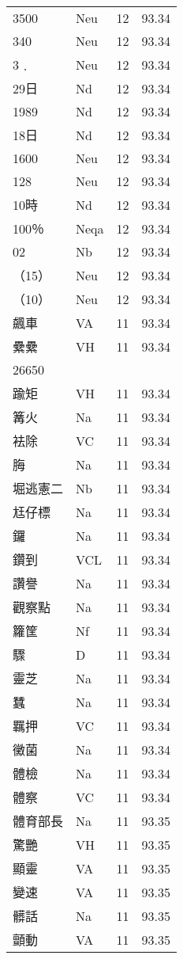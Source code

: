 \documentclass[twocolumn]{book}
\begin{document}
\begin{supertabular}{llrr}
3500 & Neu & 12 &  93.34\\
340 & Neu & 12 &  93.34\\
3﹒ & Neu & 12 &  93.34\\
29日 & Nd & 12 &  93.34\\
1989 & Nd & 12 &  93.34\\
18日 & Nd & 12 &  93.34\\
1600 & Neu & 12 &  93.34\\
128 & Neu & 12 &  93.34\\
10時 & Nd & 12 &  93.34\\
100％ & Neqa & 12 &  93.34\\
02 & Nb & 12 &  93.34\\
（15） & Neu & 12 &  93.34\\
（10） & Neu & 12 &  93.34\\
飆車 & VA & 11 &  93.34\\
纍纍 & VH & 11 &  93.34\\
26650\\
踰矩 & VH & 11 &  93.34\\
篝火 & Na & 11 &  93.34\\
袪除 & VC & 11 &  93.34\\
脢 & Na & 11 &  93.34\\
堀逃憲二 & Nb & 11 &  93.34\\
尪仔標 & Na & 11 &  93.34\\
鑼 & Na & 11 &  93.34\\
鑽到 & VCL & 11 &  93.34\\
讚譽 & Na & 11 &  93.34\\
觀察點 & Na & 11 &  93.34\\
籮筐 & Nf & 11 &  93.34\\
驟 & D & 11 &  93.34\\
靈芝 & Na & 11 &  93.34\\
蠶 & Na & 11 &  93.34\\
羈押 & VC & 11 &  93.34\\
黴菌 & Na & 11 &  93.34\\
體檢 & Na & 11 &  93.34\\
體察 & VC & 11 &  93.34\\
體育部長 & Na & 11 &  93.35\\
驚艷 & VH & 11 &  93.35\\
顯靈 & VA & 11 &  93.35\\
變速 & VA & 11 &  93.35\\
髒話 & Na & 11 &  93.35\\
顫動 & VA & 11 &  93.35\\

\end{supertabular}
\end{document}
